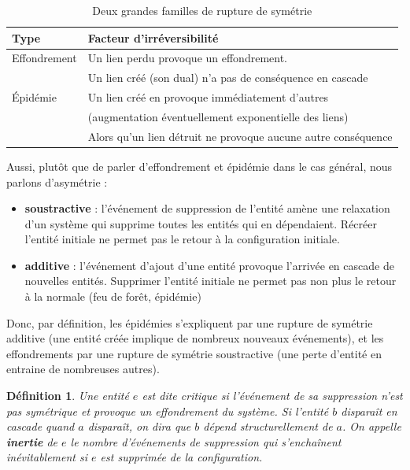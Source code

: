 \documentclass{report}
\newtheorem{definition}{Définition}[section]
\begin{document}
		\begin{table}[H]
			\centering
			\begin{tabular}{|l|l|}
				\hline 
				\textbf{Type} & \textbf{Facteur d'irréversibilité} \\
				\hline 
				Effondrement & Un lien perdu provoque un effondrement. \\
				& Un lien créé (son dual) n'a pas de conséquence en cascade \\
				\hline 
				Épidémie & Un lien créé en provoque immédiatement d'autres \\
				& (augmentation éventuellement exponentielle des liens) \\
				& Alors qu'un lien détruit ne provoque aucune autre conséquence \\
				\hline 
			\end{tabular}
			\caption{Deux grandes familles de rupture de symétrie}
		\end{table}
		
		Aussi, plutôt que de parler d'effondrement et épidémie dans le cas général, nous parlons d'asymétrie : 
		\begin{itemize}
			\item \textbf{soustractive} : l'événement de suppression de l'entité amène une \og{}relaxation d'un système\fg{} qui supprime toutes les entités qui en dépendaient. Récréer l'entité initiale ne permet pas le retour à la configuration initiale. 
			\item \textbf{additive} : l'événement d'ajout d'une entité provoque l'arrivée en cascade de nouvelles entités. Supprimer l'entité initiale ne permet pas non plus le retour à la normale (feu de forêt, épidémie)
		\end{itemize}	
		
		
		Donc, par définition, les épidémies s'expliquent par une rupture de symétrie additive (une entité créée implique de nombreux nouveaux événements), et les effondrements par une rupture de symétrie soustractive (une perte d'entité en entraine de nombreuses autres). 
		
		\begin{definition}
			Une entité $e$ est dite critique si l'événement de sa suppression n'est pas symétrique et provoque un effondrement du système. Si l'entité $b$ disparaît en cascade quand $a$ disparaît, on dira que $b$ dépend structurellement de $a$. On appelle \textbf{inertie} de $e$ le nombre d'événements de suppression qui s'enchaînent inévitablement si $e$ est supprimée de la configuration.
		\end{definition}
		
\end{document}
